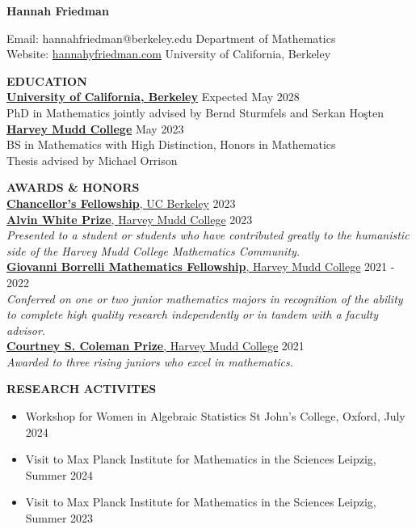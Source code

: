 \documentclass[11pt]{article}
\newcommand{\hdr}[1]{\textcolor{blue(ryb)}{\textbf{#1}}}
\newcommand{\role}[3]{\underline{\textbf{#1}, {#2}} \hfill #3}
\begin{document}
\begin{center}
\hdr{\Large{Hannah Friedman}}\\
\end{center}
Email: hannahfriedman@berkeley.edu \hfill Department of Mathematics\\
Website: \url{hannahyfriedman.com} \hfill University of California, Berkeley

\bigskip
\raggedright
\hdr{EDUCATION}\\
\textbf{\underline{University of California, Berkeley}} \hfill Expected May 2028\\
PhD in Mathematics jointly advised by Bernd Sturmfels and Serkan Ho\c{s}ten\\
\textbf{\underline{Harvey Mudd College}} \hfill May 2023\\
BS in Mathematics with High Distinction, Honors in Mathematics\\
Thesis advised by Michael Orrison

\bigskip

\hdr{AWARDS \& HONORS}\\
\role{Chancellor's Fellowship}{UC Berkeley}{2023}\\
\role{Alvin White Prize}{Harvey Mudd College}{2023}\\
\textit{Presented to a student or students who have contributed greatly to the humanistic side of the Harvey Mudd College Mathematics Community.}\\
\role{Giovanni Borrelli Mathematics Fellowship}{Harvey Mudd College}{2021 - 2022}\\
\textit{Conferred on one or two junior mathematics majors in recognition of the ability to complete high quality research independently or in tandem with a faculty advisor.}\\
\role{Courtney S. Coleman Prize}{Harvey Mudd College}{2021}\\
\textit{Awarded to three rising juniors who excel in mathematics.}

\bigskip

\hdr{RESEARCH ACTIVITES}\\
\begin{itemize}
  \item Workshop for Women in Algebraic Statistics \hfill St John's College, Oxford, July 2024
  \item Visit to Max Planck Institute for Mathematics in the Sciences \hfill Leipzig, Summer 2024
  \item Visit to Max Planck Institute for Mathematics in the Sciences \hfill Leipzig, Summer 2023
\end{itemize}
\end{document}

